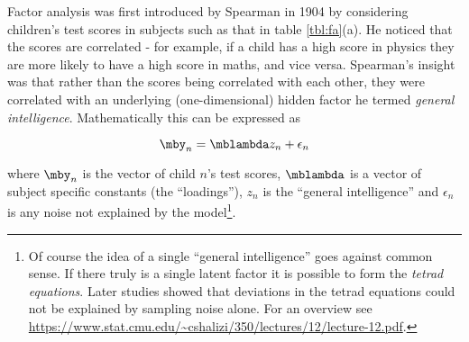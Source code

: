 \begin{table}
  \centering
{}
\hspace{5pt}
\caption{Spearman noted that children's test scores were correlated across subjects (a). Cells' expression of genes in biological pathways is likewise correlated (b).} \label{tbl:fa}
\end{table}

Factor analysis was first introduced by Spearman in 1904 \cite{spearman1904general} by considering children's test scores in subjects such as that in table \ref{tbl:fa}(a). He noticed that the scores are correlated - for example, if a child has a high score in physics they are more likely to have a high score in maths, and vice versa. Spearman's insight was that rather than the scores being correlated with each other, they were correlated with an underlying (one-dimensional) hidden factor he termed \emph{general intelligence}. Mathematically this can be expressed as

\begin{equation}
\mby_n = \mblambda z_n + \epsilon_n
\end{equation}

where $\mby_n$ is the vector of child $n$'s test scores, $\mblambda$ is a vector of subject specific constants (the ``loadings''), $z_n$ is the ``general intelligence'' and $\epsilon_n$ is any noise not explained by the model\footnote{
Of course the idea of a single ``general intelligence'' goes against common sense. If there truly is a single latent factor it is possible to form the \emph{tetrad equations}. Later studies showed that deviations in the tetrad equations could not be explained by sampling noise alone. For an overview see \url{https://www.stat.cmu.edu/~cshalizi/350/lectures/12/lecture-12.pdf}.
}.

